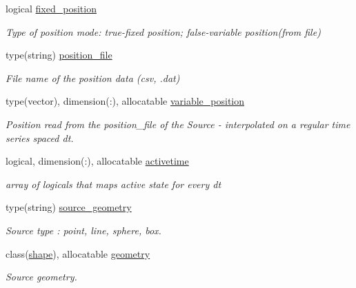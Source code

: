 \begin{DoxyCompactItemize}
logical \mbox{\hyperlink{structsources__mod_1_1source__par_a2c373733307ac5dca0f581aea21e9e03}{fixed\+\_\+position}}
\begin{DoxyCompactList}\small\item\em Type of position mode\+: true-\/fixed position; false-\/variable position(from file) \end{DoxyCompactList}\item 
type(string) \mbox{\hyperlink{structsources__mod_1_1source__par_ac9fdc2c4ad7978c22b2624946f4f5d49}{position\+\_\+file}}
\begin{DoxyCompactList}\small\item\em File name of the position data (csv, .dat) \end{DoxyCompactList}\item 
type(vector), dimension(\+:), allocatable \mbox{\hyperlink{structsources__mod_1_1source__par_afbcc10e0797e65097faa6705050481dd}{variable\+\_\+position}}
\begin{DoxyCompactList}\small\item\em Position read from the position\+\_\+file of the Source -\/ interpolated on a regular time series spaced dt. \end{DoxyCompactList}\item 
logical, dimension(\+:), allocatable \mbox{\hyperlink{structsources__mod_1_1source__par_a0cae0e51885bfad3c4972923e198f22d}{activetime}}
\begin{DoxyCompactList}\small\item\em array of logicals that maps active state for every dt \end{DoxyCompactList}\item 
type(string) \mbox{\hyperlink{structsources__mod_1_1source__par_a66e7627f128290f25c2c9eb36808eb5b}{source\+\_\+geometry}}
\begin{DoxyCompactList}\small\item\em Source type \+: \textquotesingle{}point\textquotesingle{}, \textquotesingle{}line\textquotesingle{}, \textquotesingle{}sphere\textquotesingle{}, \textquotesingle{}box\textquotesingle{}. \end{DoxyCompactList}\item 
class(\mbox{\hyperlink{structgeometry__mod_1_1shape}{shape}}), allocatable \mbox{\hyperlink{structsources__mod_1_1source__par_abf09d59fd65f02d1a8139e2f9f477207}{geometry}}
\begin{DoxyCompactList}\small\item\em Source geometry. \end{DoxyCompactList}\end{DoxyCompactItemize}


